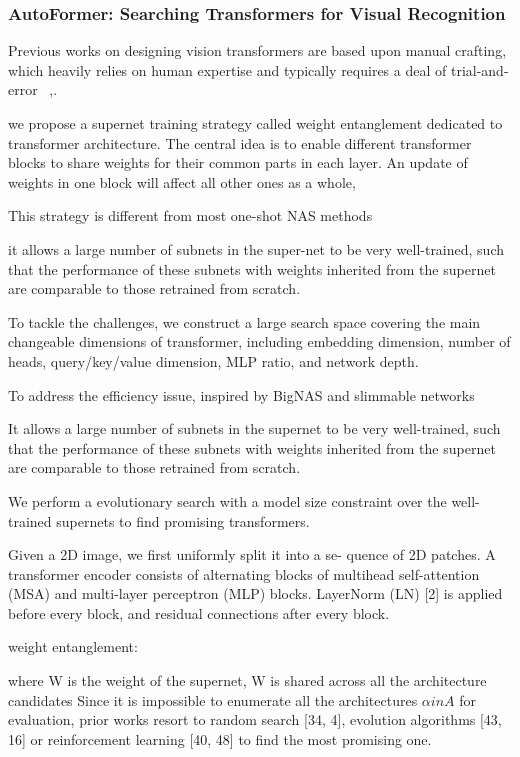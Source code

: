 \documentclass[UTF8]{article}
\begin{document}
    \subsubsection{AutoFormer: Searching Transformers for Visual Recognition}
    Previous works on designing vision transformers are based upon manual crafting, which heavily relies on human expertise and typically requires a deal of trial-and- error ~\cite{yuan2021tokens, touvron2021training, dosovitskiy2020image},.
    
    we propose a supernet training strategy called weight entanglement dedicated to transformer architecture. The central idea is to enable different transformer blocks to share weights for their common parts in each layer. An update of weights in one block will affect all other ones as a whole,
    
    This strategy is different from most one-shot NAS methods \cite{guo2020single, chu2021fairnas, wu2019fbnet}
    
    it allows a large number of subnets in the super-net to be very well-trained, such that the performance of these subnets with weights inherited from the supernet are comparable to those retrained from scratch.
    
    To tackle the challenges, we construct a large search space covering the main changeable dimensions of transformer, including embedding dimension, number of heads, query/key/value dimension, MLP ratio, and network depth.
    
    To address the efficiency issue, inspired by BigNAS \cite{yu2020bignas} and slimmable networks \cite{yu2020bignas, yu2018slimmable}
    
    It allows a large number of subnets in the supernet to be very well-trained, such that the performance of these subnets with weights inherited from the supernet are comparable to those retrained from scratch.
    
    We perform a evolutionary search with a model size constraint over the well-trained supernets to find promising transformers.
    
    Given a 2D image, we first uniformly split it into a se- quence of 2D patches. A transformer encoder consists of alternating blocks of multihead self-attention (MSA) and multi-layer perceptron (MLP) blocks. LayerNorm (LN) [2] is applied before every block, and residual connections after every block.
    
    weight entanglement:
    
    where W is the weight of the supernet, W is shared across all the architecture candidates
    Since it is impossible to enumerate all the architectures $\alpha in A$ for evaluation, prior works resort to random search [34, 4], evolution algorithms [43, 16] or reinforcement learning [40, 48] to find the most promising one.
    
\end{document}

